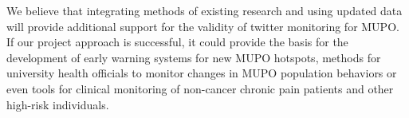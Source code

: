 \documentclass[sigconf]{acmart}
\begin{document}
We believe that integrating methods of existing research and using 
updated data will provide additional support for the validity of twitter 
monitoring for MUPO. If our project approach is successful, it could provide 
the basis for the development of early warning systems for new MUPO hotspots, 
methods for university health officials to monitor changes in MUPO population 
behaviors or even tools for clinical monitoring of non-cancer chronic pain 
patients and other high-risk individuals. 
 






 

%
\end{document}
